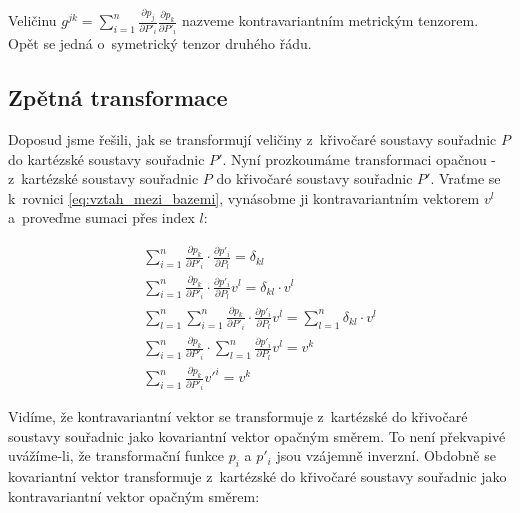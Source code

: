 Veličinu \(g^{jk} = \sum_{i=1}^n \frac{\partial p_j}{\partial P'_i} \frac{\partial p_k}{\partial P'_i}\) nazveme kontravariantním metrickým tenzorem. Opět se jedná o~symetrický tenzor druhého řádu.


\subsection{Zpětná transformace}

Doposud jsme řešili, jak se transformují veličiny z~křivočaré soustavy souřadnic \(P\) do kartézské soustavy souřadnic \(P'\). Nyní prozkoumáme transformaci opačnou - z~kartézské soustavy souřadnic \(P\) do křivočaré soustavy souřadnic \(P'\).
Vraťme se k~rovnici \eqref{eq:vztah_mezi_bazemi}, vynásobme ji kontravariantním vektorem \(v^l\) a~proveďme sumaci přes index \(l\):
 
\begin{equation}
\label{eq:transformace_kontravariantniho_vektoru_z_kartezske_soustavy}
\begin{split}
\sum_{i=1}^n \frac{\partial p_k}{\partial P'_i} \cdot \frac{\partial p'_i}{\partial P_l} = \delta_{kl} \\
\sum_{i=1}^n \frac{\partial p_k}{\partial P'_i} \cdot \frac{\partial p'_i}{\partial P_l} v^l = \delta_{kl} \cdot v^l \\
\sum_{l=1}^n \sum_{i=1}^n \frac{\partial p_k}{\partial P'_i} \cdot \frac{\partial p'_i}{\partial P_l} v^l = \sum_{l=1}^n \delta_{kl} \cdot v^l \\
\sum_{i=1}^n \frac{\partial p_k}{\partial P'_i} \cdot \sum_{l=1}^n \frac{\partial p'_i}{\partial P_l} v^l = v^k \\
\sum_{i=1}^n \frac{\partial p_k}{\partial P'_i} v'^i = v^k
\end{split}
\end{equation}

Vidíme, že kontravariantní vektor se transformuje z~kartézské do křivočaré soustavy souřadnic jako kovariantní vektor opačným směrem. To není překvapivé uvážíme-li, že transformační funkce \(p_i\) a \(p'_i\) jsou vzájemně inverzní. Obdobně se kovariantní vektor transformuje z~kartézské do křivočaré soustavy souřadnic jako kontravariantní vektor opačným směrem:

